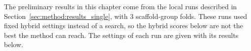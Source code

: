 

The preliminary results in this chapter come from the local runs described in Section~\ref{sec:method:results_single}, with 3 scaffold-group folds. These runs used fixed hybrid settings instead of a search, so the hybrid scores below are not the best the method can reach. The settings of each run are given with its results below.


